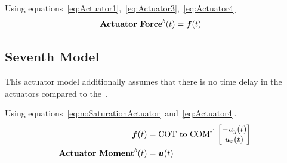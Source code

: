 Using equations~\eqref{eq:Actuator1},~\eqref{eq:Actuator3},~\eqref{eq:Actuator4} 
\begin{align}
    \label{eq:noSaturationActuator}
    \mathbf{Actuator\ Force}^b(t) &= \bm f(t)
\end{align}
%
\subsection{Seventh Model} 
\label{No Time Delay Actuator}
This actuator model additionally assumes that there is no time delay in the actuators compared to the~.

Using equations~\eqref{eq:noSaturationActuator} and~\eqref{eq:Actuator4}.
\begin{align}  
    \label{eq:ActuatorSimple1}
    \bm f(t) &= \mathrm{COT\ to\ COM}^{\text{-}1}\begin{bmatrix}
        - u_y(t) \\
         u_x(t)
    \end{bmatrix} \\
    \mathbf{Actuator\ Moment}^b(t) &= \bm u(t)
\end{align}